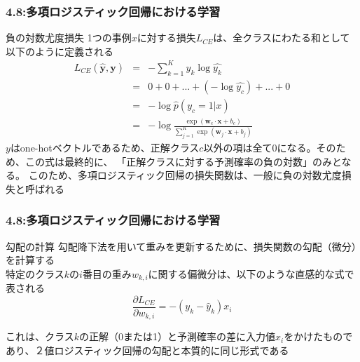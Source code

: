 \documentclass[unicode,11pt]{beamer} %
\begin{document}
\begin{frame}
    \frametitle{4.8:多項ロジスティック回帰における学習}
    \begin{alertblock}{負の対数尤度損失}
        1つの事例$x$に対する損失$L_{CE}$は、全クラスにわたる和として以下のように定義される
        \begin{eqnarray*}
            L_{CE}(\boldsymbol{\hat{y}}, \boldsymbol{y}) &=& - \sum_{k = 1}^K y_k \log \hat{y_k} \\
                                                         &=& 0 + 0 + ... + (- \log \hat{y_c}) + ... + 0\\
                                                         &=& - \log \hat{p}(y_c = 1|x) \\
                                                         &=& - \log \frac{\exp(\boldsymbol{w}_c \cdot \boldsymbol{x} + b_c)}{\sum_{j=1}^{K} \exp(\boldsymbol{w}_j \cdot \boldsymbol{x} + b_j)}
        \end{eqnarray*}
        $y$はone-hotベクトルであるため、正解クラス$c$以外の項は全て0になる。そのため、この式は最終的に、
        「正解クラスに対する予測確率の負の対数」のみとなる。
        このため、多項ロジスティック回帰の損失関数は、一般に負の対数尤度損失と呼ばれる
    \end{alertblock}
\end{frame}

\begin{frame}
    \frametitle{4.8:多項ロジスティック回帰における学習}
    \begin{alertblock}{勾配の計算}
        勾配降下法を用いて重みを更新するために、損失関数の勾配（微分）を計算する
        \\特定のクラス$k$の$i$番目の重み$w_{k,i}$に関する偏微分は、以下のような直感的な式で表される
        \begin{equation*}
            \frac{\partial L_{CE}}{\partial w_{k, i}} = -(y_k - \hat{y}_k) x_i
        \end{equation*}

        これは、クラス$k$の正解（0または1）と予測確率の差に入力値$x_i$をかけたものであり、２値ロジスティック回帰の勾配と本質的に同じ形式である
    \end{alertblock}
\end{frame}

\end{document}
